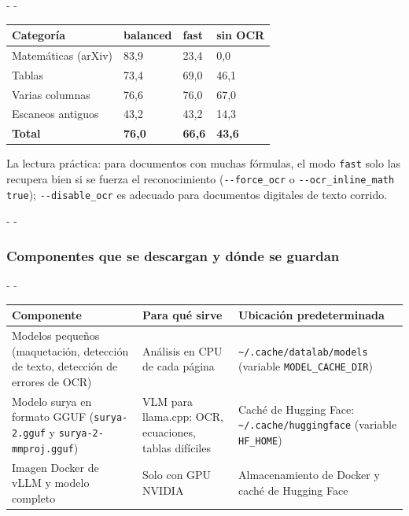 \documentclass[11pt,a4paper]{article}
\makeatletter
\newcommand{\necesitaespacio}[1]{\par\penalty-100\begingroup
	\setlength{\dimen@}{#1}\dimen@ii\pagegoal\advance\dimen@ii-\pagetotal
	\ifdim\dimen@>\dimen@ii\ifdim\dimen@ii>\z@\vfil\fi\penalty-\@M\fi\endgroup}
\newcommand{\opt}[1]{\texttt{\textcolor{colopt}{#1}}}      %
\newcommand{\arch}[1]{\texttt{\textcolor{colarch}{#1}}}    %
\newcommand{\val}[1]{\texttt{#1}}                          %
\newcommand{\cab}[1]{\textbf{#1}}
\newcommand{\tl}{\textasciitilde{}}  %
\makeatother
\begin{document}
	\begingroup\small
	\necesitaespacio{10\baselineskip}
	\begin{longtable}{L{5.06cm}C{2.4cm}C{2.4cm}C{2.4cm}}
		\toprule{}\cab{Categoría} & \cab{balanced} & \cab{fast} & \cab{sin OCR}\\\midrule
		\endfirsthead
		\bottomrule
		\endfoot
		Matemáticas (arXiv) & 83,9 & 23,4 & 0,0\\*
		Tablas & 73,4 & 69,0 & 46,1\\
		Varias columnas & 76,6 & 76,0 & 67,0\\
		Escaneos antiguos & 43,2 & 43,2 & 14,3\\*
		\textbf{Total} & \textbf{76,0} & \textbf{66,6} & \textbf{43,6}\\
	\end{longtable}
	\endgroup
	
	La lectura práctica: para documentos con muchas fórmulas, el modo \val{fast} solo las recupera bien si se fuerza el reconocimiento (\opt{-{}-force\_ocr} o \opt{-{}-ocr\_\allowbreak{}inline\_\allowbreak{}math true}); \opt{-{}-disable\_ocr} es adecuado para documentos digitales de texto corrido.
	
	\necesitaespacio{20\baselineskip}
	\subsubsection{Componentes que se descargan y dónde se guardan}
	
	\begingroup\small
	\necesitaespacio{16\baselineskip}
	\begin{longtable}{L{4.5cm}L{5.2cm}L{5.36cm}}
		\toprule{}\cab{Componente} & \cab{Para qué sirve} & \cab{Ubicación predeterminada}\\\midrule
		\endfirsthead
		\bottomrule
		\endfoot
		Modelos pequeños (maquetación, detección de texto, detección de errores de OCR) & Análisis en CPU de cada página & \arch{\tl/\allowbreak{}.cache/\allowbreak{}datalab/\allowbreak{}models} (variable \texttt{MODEL\_\allowbreak{}CACHE\_\allowbreak{}DIR})\\*
		Modelo surya en formato GGUF (\texttt{surya-2.gguf} y \texttt{surya-\allowbreak{}2-\allowbreak{}mmproj.gguf}) & VLM para llama.cpp: OCR, ecuaciones, tablas difíciles & Caché de Hugging Face: \arch{\tl/\allowbreak{}.cache/\allowbreak{}huggingface} (variable \texttt{HF\_HOME})\\*
		Imagen Docker de vLLM y modelo completo & Solo con GPU NVIDIA & Almacenamiento de Docker y caché de Hugging Face\\
	\end{longtable}
	\endgroup
	
\end{document}
